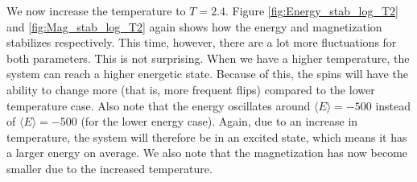 \documentclass[12pt]{article}
\begin{document}
We now increase the temperature to $T = 2.4$. Figure \ref{fig:Energy_stab_log_T2} and \ref{fig:Mag_stab_log_T2} again shows how the energy and magnetization stabilizes respectively. This time, however, there are a lot more fluctuations for both parameters. This is not surprising. When we have a higher temperature, the system can reach a higher energetic state. Because of this, the spins will have the ability to change more (that is, more frequent flips) compared to the lower temperature case. Also note that the energy oscillates around $\langle E \rangle = -500$ instead of $\langle E \rangle = -500$ (for the lower energy case). Again, due to an increase in temperature, the system will therefore be in an excited state, which means it has a larger energy on average. We also note that the magnetization has now become smaller due to the increased temperature.
\end{document}
